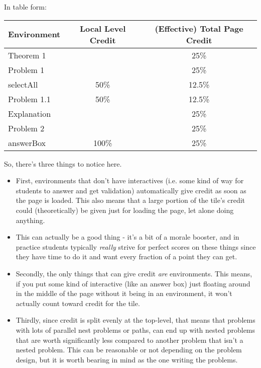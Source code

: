 \documentclass{ximera}
\begin{document}
        In table form:
        \begin{center}
            \begin{tabular}{lcc}
                Environment     & Local Level Credit        & (Effective) Total Page Credit\\\hline
                Theorem 1                                   && 25\% \\
                Problem 1                                   && 25\% \\
                    selectAll   &50\%                       & 12.5\% \\
                    Problem 1.1 &50\%                        & 12.5\% \\
                Explanation                                   && 25\% \\
                Problem 2                                   && 25\% \\
                    answerBox   &100\%                       & 25\%
            \end{tabular}
        \end{center}
        
        So, there's three things to notice here. 
        
        \begin{itemize}
            \item First, environments that don't have interactives (i.e. some kind of way for students to answer and get validation) automatically give credit as soon as the page is loaded. This also means that a large portion of the tile's credit could (theoretically) be given just for loading the page, let alone doing anything.
                \item This can actually be a good thing - it's a bit of a morale booster, and in practice students typically \textit{really} strive for perfect scores on these things since they have time to do it and want every fraction of a point they can get.
            \item Secondly, the only things that can give credit \textit{are} environments. This means, if you put some kind of interactive (like an answer box) just floating around in the middle of the page without it being in an environment, it won't actually count toward credit for the tile.
            \item Thirdly, since credit is split evenly at the top-level, that means that problems with lots of parallel nest problems or paths, can end up with nested problems that are worth significantly less compared to another problem that isn't a nested problem. This can be reasonable or not depending on the problem design, but it is worth bearing in mind as the one writing the problems.
                
        \end{itemize}

        
\end{document}
